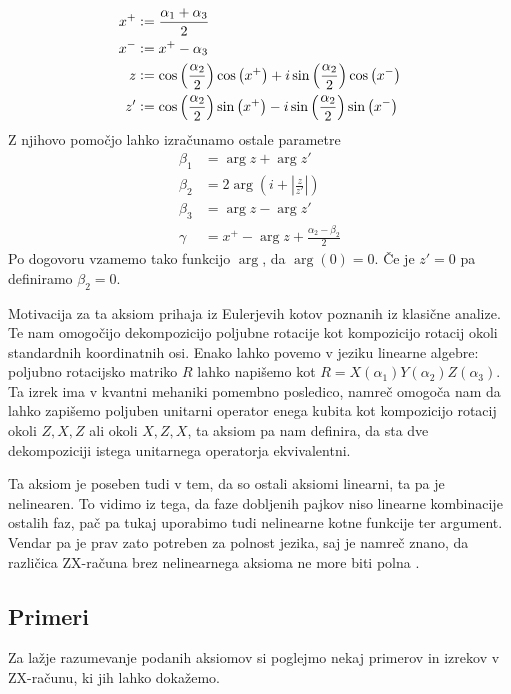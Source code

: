 \documentclass[mat1]{fmfdelo}
\newcommand{\defeq}{\vcentcolon=}
\begin{document}
\begin{align*}
    x^+ &\defeq \frac{\alpha_1 + \alpha_3}{2}\\
    x^- &\defeq x^+-\alpha_3\\
    z &\defeq \cos\left(\frac{\alpha_2}{2}\right)\cos\left(x^+\right) + i\sin\left(\frac{\alpha_2}{2}\right)\cos\left(x^-\right)\\
    z' &\defeq \cos\left(\frac{\alpha_2}{2}\right)\sin\left(x^+\right) - i\sin\left(\frac{\alpha_2}{2}\right)\sin\left(x^-\right)
\end{align*}
Z njihovo pomočjo lahko izračunamo ostale parametre
\begin{align*}
    \beta_1 &= \arg z + \arg z'\\
    \beta_2 &= 2\arg\left(i+\left\lvert\frac{z}{z'}\right\rvert\right)\\
    \beta_3 &= \arg z - \arg z'\\
    \gamma &= x^+-\arg z + \frac{\alpha_2-\beta_2}{2}
\end{align*}
Po dogovoru vzamemo tako funkcijo \(\arg\), da \(\arg(0)=0\). Če je \(z'=0\) pa definiramo \(\beta_2 = 0\).

Motivacija za ta aksiom prihaja iz Eulerjevih kotov poznanih iz klasične analize. Te nam omogočijo dekompozicijo poljubne rotacije kot kompozicijo rotacij okoli standardnih koordinatnih osi. Enako lahko povemo v jeziku linearne algebre: poljubno rotacijsko matriko \(R\) lahko napišemo kot \(R=X(\alpha_1)Y(\alpha_2)Z(\alpha_3)\). Ta izrek ima v kvantni mehaniki pomembno posledico, namreč omogoča nam da lahko zapišemo poljuben unitarni operator enega kubita kot kompozicijo rotacij okoli \(Z,X,Z\) ali okoli \(X,Z,X\), ta aksiom pa nam definira, da sta dve dekompoziciji istega unitarnega operatorja ekvivalentni.

Ta aksiom je poseben tudi v tem, da so ostali aksiomi linearni, ta pa je nelinearen. To vidimo iz tega, da faze dobljenih pajkov niso linearne kombinacije ostalih faz, pač pa tukaj uporabimo tudi nelinearne kotne funkcije ter argument. Vendar pa je prav zato potreben za polnost jezika, saj je namreč znano, da različica ZX-računa brez nelinearnega aksioma ne more biti polna \cite[izrek 6.1]{jeandeldiagrammatic}.

\subsection{Primeri}
Za lažje razumevanje podanih aksiomov si poglejmo nekaj primerov in izrekov v ZX-računu, ki jih lahko dokažemo.
\end{document}
